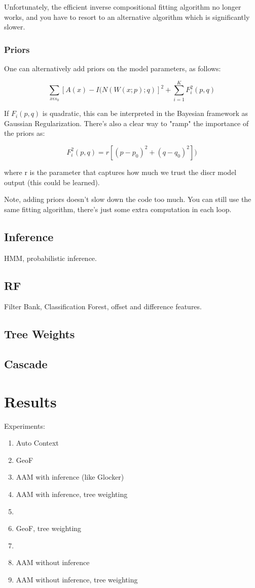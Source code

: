\documentclass[10pt,twocolumn,letterpaper]{article}
\begin{document}
Unfortunately, the efficient inverse compositional fitting algorithm no longer works, and you have to resort to an alternative algorithm which is significantly slower.

\subsubsection{Priors}

One can alternatively add priors on the model parameters, as follows:

\[ \sum_{x \epsilon s_0} [A(x) - I(N(W(x;p);q)]^2 + \sum_{i=1}^K F_i^2(p,q) \]

If $F_i(p,q)$ is quadratic, this can be interpreted in the Bayesian framework as Gaussian Regularization.  There's also a clear way to "ramp" the importance of the priors as:

\[ F_i^2(p,q) = r[(p-p_0)^2+(q-q_0)^2]) \]

where r is the parameter that captures how much we trust the discr model output (this could be learned).

Note, adding priors doesn't slow down the code too much.  You can still use the same fitting algorithm, there's just some extra computation in each loop.

\subsection{Inference}
HMM, probabilistic inference.

\subsection{RF}
Filter Bank, Classification Forest, offset and difference features. 

\subsection{Tree Weights}
 
\subsection{Cascade}

\section{Results}

Experiments:
\begin{enumerate}
\item Auto Context
\item GeoF
\item AAM with inference (like Glocker)
\item AAM with inference, tree weighting
\item 
\item GeoF, tree weighting
\item
\item AAM without inference
\item AAM without inference, tree weighting
\end{enumerate}
\end{document}
